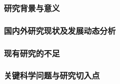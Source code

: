 \justifying
\NSFCBodyText

\subsubsection{研究背景与意义}

\subsubsection{国内外研究现状及发展动态分析}

\subsubsection{现有研究的不足}

\subsubsection{关键科学问题与研究切入点}
